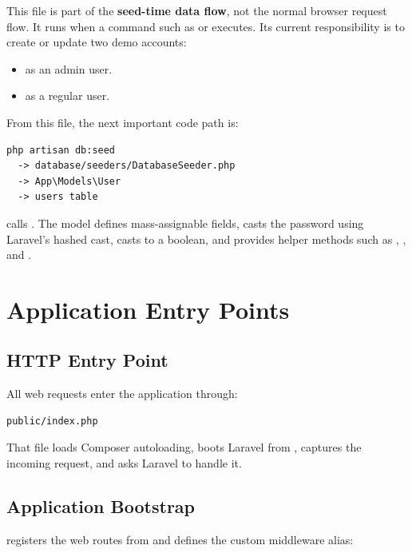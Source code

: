 \documentclass[11pt,a4paper]{article}
\begin{document}
This file is part of the \textbf{seed-time data flow}, not the normal browser request flow. It runs when a command such as  or  executes. Its current responsibility is to create or update two demo accounts:

\begin{itemize}
    \item {} as an admin user.
    \item {} as a regular user.
\end{itemize}

From this file, the next important code path is:

\begin{verbatim}
php artisan db:seed
  -> database/seeders/DatabaseSeeder.php
  -> App\Models\User
  -> users table
\end{verbatim}

 calls . The  model defines mass-assignable fields, casts the password using Laravel's hashed cast, casts  to a boolean, and provides helper methods such as , , and .

\section{Application Entry Points}

\subsection{HTTP Entry Point}

All web requests enter the application through:

\begin{verbatim}
public/index.php
\end{verbatim}

That file loads Composer autoloading, boots Laravel from , captures the incoming request, and asks Laravel to handle it.

\subsection{Application Bootstrap}

 registers the web routes from  and defines the custom middleware alias:
\end{document}
